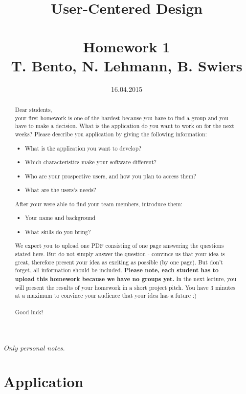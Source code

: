\documentclass{article}
\title{User-Centered Design\\~\\Homework 1\\ \small{T. Bento, N. Lehmann, B. Swiers}}
\date{16.04.2015}
\begin{document}
\renewcommand\abstractname{Assignment}
\maketitle


\begin{abstract}
{\huge D}ear students,\\
your first homework is one of the hardest because you have to find a group and you have to make a decision. What is the application do you want to work on for the next weeks? Please describe you application by giving the following information:
\begin{itemize}
\item What is the application you want to develop?
\item Which characteristics make your software different?
\item Who are your prospective users, and how you plan to access them?
\item What are the users's needs?
\end{itemize}
After your were able to find your team members, introduce them:
\begin{itemize}
\item Your name and background
\item What skills do you bring?
\end{itemize}
We expect you to upload one PDF consisting of one page answering the questions stated here. But do not simply answer the question - convince us that your idea is great, therefore present your idea as exciting as possible (by one page). But don't forget, all information should be included. \textbf{Please note, each student has to upload this homework because we have no groups yet.} In the next lecture, you will present the results of your homework in a short project pitch. You have 3 minutes at a maximum to convince your audience that your idea has a future :)\\
\\
Good luck!
\end{abstract}

\newpage


\textit{Only personal notes.}

\section*{Application}
\end{document}
